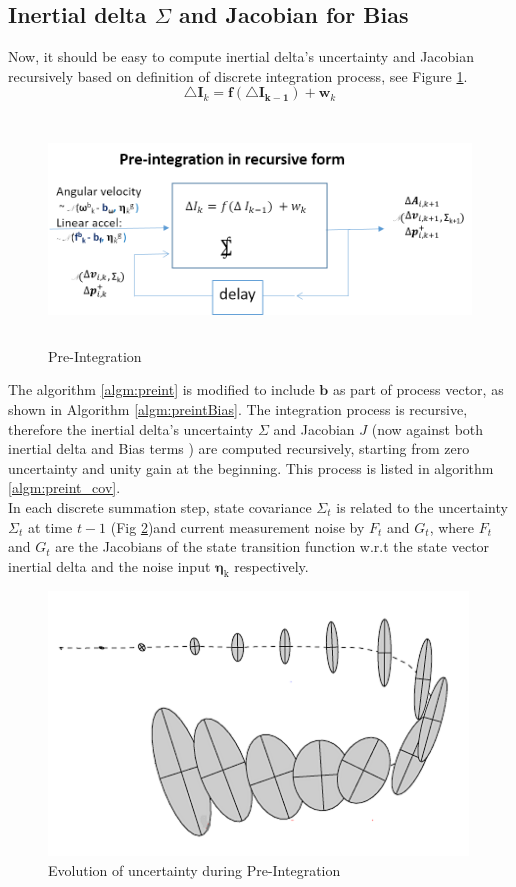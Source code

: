 \documentclass[12pt]{article}   %
\begin{document}
\subsection{Inertial delta $\Sigma$ and Jacobian for Bias}
Now, it should be easy to compute inertial delta's uncertainty and Jacobian recursively based on definition of discrete integration process, see Figure \ref{fig:preintBlock}. 
\begin{equation}
\triangle {\bm{I}}_k = \bm{f}( \bm{\triangle I_{k-1}}) + \bm{w}_k
\end{equation}

\begin{figure}[h!]
	\label{fig:preintBlock}
	\includegraphics[height=6cm]{figures/Pre-integration_block-flow.png}
	\caption{Pre-Integration}
\end{figure}

The algorithm \ref{algm:preint} is modified to include $\bm{b}$ as part of process vector, as shown in Algorithm \ref{algm:preintBias}. The integration process is recursive, therefore the inertial delta's uncertainty $\Sigma$ and Jacobian $J$ (now against both inertial delta and Bias terms ) are computed recursively, starting from zero uncertainty and unity gain at the beginning. This process is listed in algorithm \ref{algm:preint_cov}. \\
In each discrete summation step, state covariance $\Sigma_t$ is related to the uncertainty $\Sigma_t$ at time $t-1$ (Fig \ref{fig:preintUncertainty})and current measurement noise by $F_t$ and $G_t$, where $F_t$ and $G_t$ are the Jacobians of the state transition function w.r.t the state vector inertial delta and the noise input $\mathrm{\bm{\eta}_k}$ respectively.
\begin{figure}[h!]
	\label{fig:preintUncertainty}
	\includegraphics[height=7cm]{figures/Inertial-delta_covariance_evolution.png}
	\caption{Evolution of uncertainty during Pre-Integration}
\end{figure}
\end{document}

